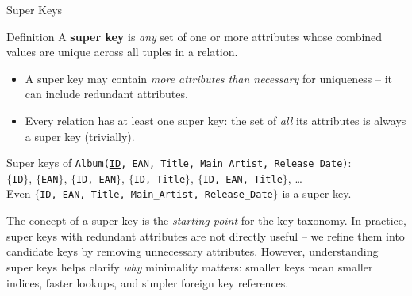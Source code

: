 \begin{frame}{Super Keys}
  \begin{block}{Definition}
    A \textbf{super key} is \emph{any} set of one or more attributes whose
    combined values are unique across all tuples in a relation.
    \begin{itemize}
      \item A super key may contain \emph{more attributes than necessary}
            for uniqueness -- it can include redundant attributes.
      \item Every relation has at least one super key: the set of
            \emph{all} its attributes is always a super key (trivially).
    \end{itemize}
  \end{block}

  \begin{examples}{}
    Super keys of \texttt{Album(\underline{ID}, EAN, Title, Main\_Artist, Release\_Date)}:\\[4pt]
    $\{$\texttt{ID}$\}$, \quad
    $\{$\texttt{EAN}$\}$, \quad
    $\{$\texttt{ID, EAN}$\}$, \quad
    $\{$\texttt{ID, Title}$\}$, \quad
    $\{$\texttt{ID, EAN, Title}$\}$, \quad \ldots\\[4pt]
    Even $\{$\texttt{ID, EAN, Title, Main\_Artist, Release\_Date}$\}$ is a super key.
  \end{examples}

  The concept of a super key is the \emph{starting point} for the key
  taxonomy.  In practice, super keys with redundant attributes are not
  directly useful -- we refine them into candidate keys by removing
  unnecessary attributes.  However, understanding super keys helps clarify
  \emph{why} minimality matters: smaller keys mean smaller indices, faster
  lookups, and simpler foreign key references.
\end{frame}

